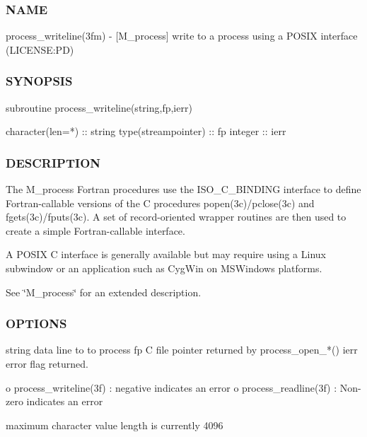 \subsubsection*{N\+A\+ME}

process\+\_\+writeline(3fm) -\/ \mbox{[}M\+\_\+process\mbox{]} write to a process using a P\+O\+S\+IX interface (L\+I\+C\+E\+N\+SE\+:PD) 

\subsubsection*{S\+Y\+N\+O\+P\+S\+IS}

\begin{DoxyVerb} subroutine process_writeline(string,fp,ierr)

   character(len=*)    :: string
   type(streampointer) :: fp
   integer             :: ierr
\end{DoxyVerb}


\subsubsection*{D\+E\+S\+C\+R\+I\+P\+T\+I\+ON}

The M\+\_\+process Fortran procedures use the I\+S\+O\+\_\+\+C\+\_\+\+B\+I\+N\+D\+I\+NG interface to define Fortran-\/callable versions of the C procedures popen(3c)/pclose(3c) and fgets(3c)/fputs(3c). A set of record-\/oriented wrapper routines are then used to create a simple Fortran-\/callable interface.

A P\+O\+S\+IX C interface is generally available but may require using a Linux subwindow or an application such as Cyg\+Win on M\+S\+Windows platforms.

See \char`\"{}\+M\+\_\+process\char`\"{} for an extended description.

\subsubsection*{O\+P\+T\+I\+O\+NS}

\begin{DoxyVerb}string   data line to to process
fp       C file pointer returned by process_open_*()
ierr     error flag returned.

          o process_writeline(3f) : negative indicates an error
          o process_readline(3f)  : Non-zero indicates an error

maximum character value length is currently 4096
\end{DoxyVerb}


